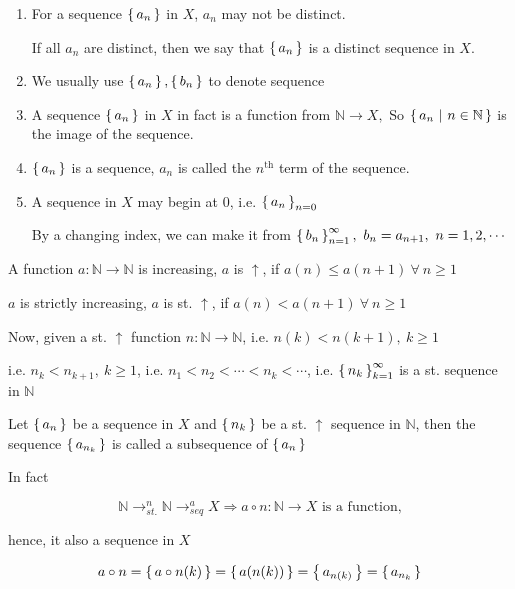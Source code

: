 \begin{rmk*} $ $
	\begin{enumerate}
		\item For a sequence $\left\{ \,a_n \,\right\}$ in $X$, $a_n$ may not be distinct.
		
		If all $a_n$ are distinct, then we say that $\left\{ \,a_n \,\right\}$ is a distinct sequence in $X$.
		
		\item We usually use $\left\{ \,a_n \,\right\},\left\{ \,b_n \,\right\}$ to denote sequence
		\item A sequence $\left\{ \,a_n \,\right\}$ in $X$ in fact is a function from $\mathbb N \rightarrow X,$ So $\left\{ \,a_n~|~n \in \mathbb N \,\right\}$ is the image of the sequence.
		\item $\left\{ \,a_n \,\right\}$ is a sequence, $a_n$ is called the $n^{\text{th}}$ term of the sequence.
		\item A sequence in $X$ may begin at $0$, i.e. $\left\{ \,a_n \,\right\}_{n=0}$
		
		By a changing index, we can make it from $\left\{ \,b_n \,\right\}^{\infty}_{n=1},~b_n = a_{n+1},~n = 1,2,\cdots$ 
	
	\end{enumerate}
\end{rmk*}

\begin{defn}[increasing] $ $\\
	A function $a:\mathbb N \rightarrow \mathbb N$ is increasing, $a$ is $\uparrow$, if $a(n) \leq a(n+1) ~\forall~n \geq 1$
	
	$a$ is strictly increasing, $a$ is st. $\uparrow$, if $a(n) < a(n+1) ~\forall~n \geq 1$
\end{defn}

Now, given a st. $\uparrow$ function $n:\mathbb N \rightarrow \mathbb N$, i.e. $n(k) < n(k+1),~k \geq 1$

i.e. $n_k < n_{k+1},~k \geq 1$, i.e. $n_1<n_2<\cdots<n_k<\cdots$, i.e. $\left\{ \,n_k \,\right\}^{\infty}_{k=1}$ is a st. sequence in $\mathbb N$

\begin{defn}
	Let $\left\{ \,a_n \,\right\}$ be a sequence in $X$ and $\left\{ \,n_k \,\right\}$ be a st. $\uparrow$ sequence in $\mathbb N$, then the sequence $\left\{ \,a_{n_k} \,\right\}$ is called a subsequence of $\left\{ \,a_n \,\right\}$
	
	In fact
	
	$$\mathbb N \rightarrow^{n}_{st.} \mathbb N \rightarrow^{a}_{seq} X  \Rightarrow a \circ n:\mathbb N \rightarrow X \text{ is a function,}$$
	
	hence, it also a sequence in $X$
	
	$$a \circ n = \left\{ \,a \circ n(k) \,\right\} = \left\{ \,a(n(k)) \,\right\} = \left\{ \,a_{n(k)} \,\right\} = \left\{ \,a_{n_k} \,\right\}$$
\end{defn}

